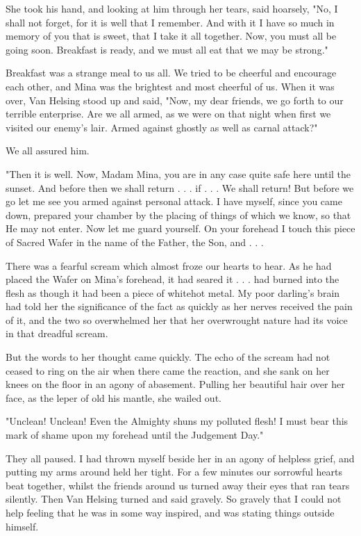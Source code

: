 She took his hand, and looking at him through her tears, said hoarsely, "No, I shall not forget, for it is well that I remember. And with it I have so much in memory of you that is sweet, that I take it all together. Now, you must all be going soon. Breakfast is ready, and we must all eat that we may be strong." 

Breakfast was a strange meal to us all. We tried to be cheerful and encourage each other, and Mina was the brightest and most cheerful of us. When it was over, Van Helsing stood up and said, "Now, my dear friends, we go forth to our terrible enterprise. Are we all armed, as we were on that night when first we visited our enemy's lair. Armed against ghostly as well as carnal attack?" 

We all assured him. 

"Then it is well. Now, Madam Mina, you are in any case quite safe here until the sunset. And before then we shall return . . . if . . . We shall return! But before we go let me see you armed against personal attack. I have myself, since you came down, prepared your chamber by the placing of things of which we know, so that He may not enter. Now let me guard yourself. On your forehead I touch this piece of Sacred Wafer in the name of the Father, the Son, and . . . 

There was a fearful scream which almost froze our hearts to hear. As he had placed the Wafer on Mina's forehead, it had seared it . . . had burned into the flesh as though it had been a piece of whitehot metal. My poor darling's brain had told her the significance of the fact as quickly as her nerves received the pain of it, and the two so overwhelmed her that her overwrought nature had its voice in that dreadful scream. 

But the words to her thought came quickly. The echo of the scream had not ceased to ring on the air when there came the reaction, and she sank on her knees on the floor in an agony of abasement. Pulling her beautiful hair over her face, as the leper of old his mantle, she wailed out. 

"Unclean! Unclean! Even the Almighty shuns my polluted flesh! I must bear this mark of shame upon my forehead until the Judgement Day." 

They all paused. I had thrown myself beside her in an agony of helpless grief, and putting my arms around held her tight. For a few minutes our sorrowful hearts beat together, whilst the friends around us turned away their eyes that ran tears silently. Then Van Helsing turned and said gravely. So gravely that I could not help feeling that he was in some way inspired, and was stating things outside himself. 

